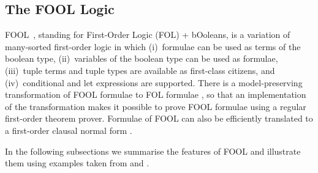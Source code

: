 \documentclass{easychair}
\begin{document}
% 
% 
% 
% 
% 

\subsection{The FOOL Logic}
\label{FOOL}
FOOL~\cite{KKV15}, standing for First-Order Logic (FOL) + bOoleans, is a 
variation of many-sorted first-order logic in which (i)~formulae can
be used as terms of the boolean type, (ii)~variables of the boolean type can
be used as formulae, (iii)~tuple terms and tuple types are available as
first-class citizens, and (iv)~conditional and let expressions are supported.
There is a model-preserving transformation of FOOL formulae to FOL formulae
\cite{KKV15}, so that an implementation of the transformation makes it 
possible to prove FOOL formulae using a regular first-order theorem prover. 
Formulae of FOOL can also be efficiently translated to a first-order clausal 
normal form \cite{KK+16-GCAI}.

In the following subsections we summarise the features of FOOL and illustrate
them using examples taken from \cite{KK+16} and \cite{KKV18}.
\end{document}

